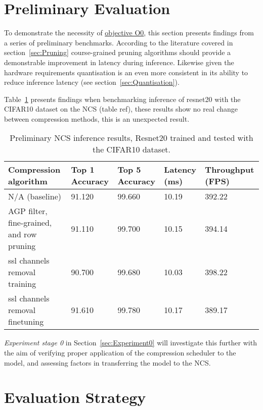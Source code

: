 \documentclass[11pt]{article}
\begin{document}
\newpage
\section{Preliminary Evaluation}\label{sec:prelimEval}
To demonstrate the necessity of \hyperref[obj:VerifyComp]{objective O0}, this section presents findings from a series of preliminary benchmarks. 
According to the literature covered in section~\ref{sec:Pruning} course-grained pruning algorithms should provide a demonstrable improvement in latency during inference.
Likewise given the hardware requirements quantisation is an even more consistent in its ability to reduce inference latency (see section~\ref{sec:Quantisation}).

Table~\ref{tab:PrelimResults} presents findings when benchmarking inference of resnet20 with the CIFAR10 dataset on the NCS (table ref), these results show no real change between compression methods, this is an unexpected result.

\begin{table}[H]
    \begin{tabular}{@{}|p{5cm}|p{2cm}|p{2cm}|p{2cm}|p{2cm}|@{}}
    \toprule
    Compression algorithm                     & Top 1 Accuracy & Top 5 Accuracy & Latency (ms) & Throughput (FPS) \\ \midrule
    N/A (baseline)                            & 91.120         & 99.660         & 10.19        & 392.22           \\ \midrule
    AGP filter, fine-grained, and row pruning & 91.110         & 99.700         & 10.15        & 394.14           \\ \midrule
    ssl channels removal training             & 90.700         & 99.680         & 10.03        & 398.22           \\ \midrule
    ssl channels removal finetuning           & 91.610         & 99.780         & 10.17        & 389.17           \\
    \bottomrule
    \end{tabular}
    \caption{Preliminary NCS inference results, Resnet20 trained and tested with the CIFAR10 dataset.}
    \label{tab:PrelimResults}
\end{table}

\emph{Experiment stage 0} in Section~\ref{sec:Experiment0} will investigate this further with the aim of verifying proper application of the compression scheduler to the model, and assessing factors in transferring the model to the NCS.

\newpage
\section{Evaluation Strategy}

\end{document}
